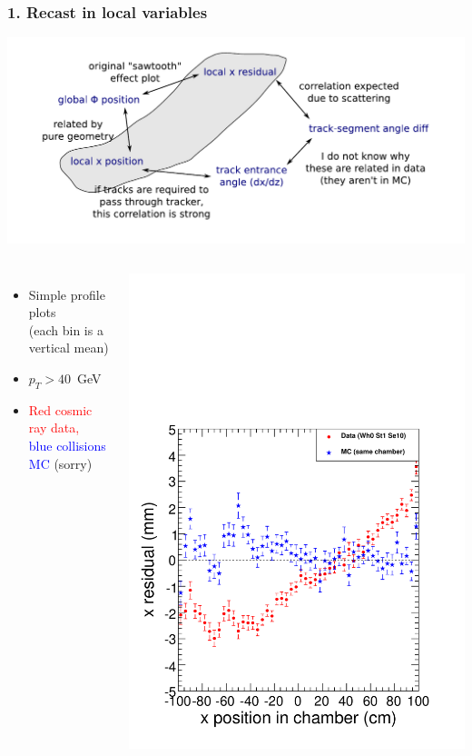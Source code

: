 \documentclass[compress]{beamer}
\begin{document}
\begin{frame}
\frametitle{1. Recast in local variables}

\includegraphics[width=0.85\linewidth]{map_of_correlations2.pdf}

\vspace{-1 cm}
\begin{columns}
\begin{itemize}
\item Simple profile plots \\ (each bin is a vertical mean)
\item $p_T > 40$~GeV
\item \textcolor{red}{Red cosmic ray data,} \\ \textcolor{blue}{blue collisions MC} (sorry)
\end{itemize}

\includegraphics[width=\linewidth]{original_sawtooth.pdf}
\end{columns}
\end{frame}
\end{document}
